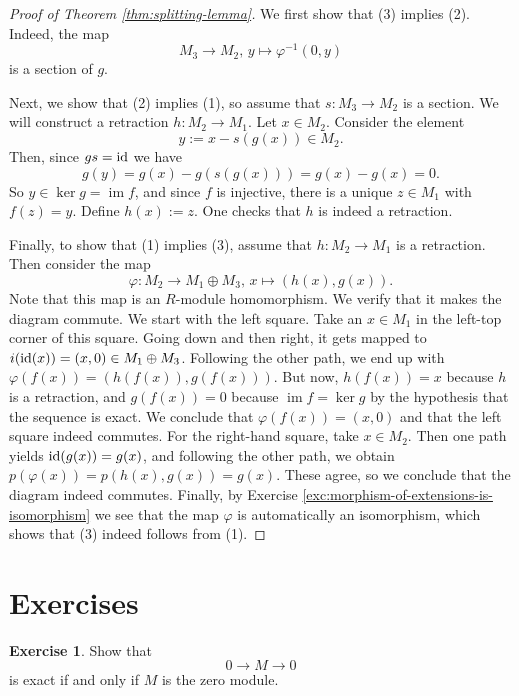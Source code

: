 \documentclass[11pt]{amsbook}
\newcommand{\longto}{\longrightarrow}
\DeclareMathOperator\im{im}
\def\id{{\rm id}}
\theoremstyle{plain}
\theoremstyle{definition}
\newtheorem{exercise}{Exercise}
\begin{document}
\begin{proof}[Proof of Theorem \ref{thm:splitting-lemma}]
We first show that (3) implies (2). Indeed, the map
\[
	M_3 \to M_2,\, y \mapsto \varphi^{-1}(0,y)
\]
is a section of $g$.

Next, we show that (2) implies (1), so assume that $s\colon M_3\to M_2$ is a section. We will construct a retraction $h\colon M_2 \to M_1$. Let $x\in M_2$. Consider the element
\[
	y := x - s(g(x)) \in M_2.
\]
Then, since $gs=\id$ we have
\[
	g(y) = g(x) - g(s(g(x))) = g(x) - g(x) = 0.
\]
So $y \in \ker g = \im f$, and since $f$ is injective, there is a {unique} $z\in M_1$ with $f(z)=y$. Define $h(x) := z$. One checks that $h$ is indeed a retraction.

Finally, to show that (1) implies (3), assume that $h\colon M_2 \to M_1$ is a retraction. Then consider the map
\[
	\varphi\colon M_2 \to M_1 \oplus M_3,\,
	x \mapsto (h(x), g(x)).
\]
Note that this map is an $R$-module homomorphism. We verify that it makes the diagram commute. We start with the left square. Take an $x\in M_1$ in the left-top corner of this square. Going down and then right, it gets mapped to $i(\id (x)) = (x,0) \in M_1 \oplus M_3$. Following the other path, we end up with
$ \varphi(f(x))= (h(f(x)),g(f(x)))$. But now, $h(f(x))=x$ because $h$ is a retraction, and $g(f(x))=0$ because $\im f = \ker g$ by the hypothesis that the sequence is exact. We conclude that $\varphi(f(x))=(x,0)$ and that the left square indeed commutes. For the right-hand square, take $x\in M_2$. Then one path yields $\id(g(x)) = g(x)$, and following the other path, we obtain $p(\varphi(x))=p(h(x),g(x))=g(x)$. These agree, so we conclude that the diagram indeed commutes. Finally, by Exercise \ref{exc:morphism-of-extensions-is-isomorphism} we see that the map $\varphi$ is automatically an isomorphism, which shows that (3) indeed follows from (1).
\end{proof}






\newpage
\section*{Exercises}




\begin{exercise}Show that
\[
	0 \longto M \longto 0
\]
is exact if and only if $M$ is the zero module.
\end{exercise}
\end{document}
